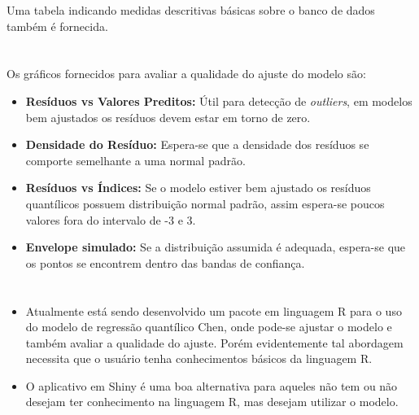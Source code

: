 \documentclass{sciposter}
\begin{document}
\begin{multicols*}{2}
{\begin{itemize}
\vspace{0.2cm}

Uma tabela indicando medidas descritivas básicas sobre o banco de dados também é fornecida.
\end{itemize}

 


\section*{}
\vspace{0.2cm}

Os gráficos fornecidos para avaliar a qualidade do ajuste do modelo são:

\begin{itemize}
  \item \textbf{Resíduos vs Valores Preditos:} Útil para detecção de \textit{outliers}, em modelos bem ajustados os resíduos devem estar em torno de zero.
  \item \textbf{Densidade do Resíduo:} Espera-se que a densidade dos resíduos se comporte semelhante a uma normal padrão.
  \item \textbf{Resíduos vs Índices:} Se o modelo estiver bem ajustado os resíduos quantílicos possuem distribuição normal padrão, assim espera-se poucos valores fora do intervalo de -3 e 3.
  \item  \textbf{Envelope simulado:} Se a distribuição assumida é adequada, espera-se que os pontos se encontrem dentro das bandas de confiança.
\end{itemize}




\section*{}
\vspace{0.2cm}
\begin{multicols}{2}{
\begin{itemize}
\item Atualmente está sendo desenvolvido um pacote em linguagem R para o uso do modelo de regressão quantílico Chen, onde pode-se ajustar o modelo e também avaliar a qualidade do ajuste.
Porém evidentemente tal abordagem necessita que o usuário
tenha conhecimentos básicos da linguagem R.
\item  O aplicativo em Shiny é uma boa alternativa para aqueles não tem ou não desejam ter conhecimento na linguagem R, mas desejam utilizar o modelo.
\end{itemize}


}
\end{multicols}}
\end{multicols*}
\end{document}
